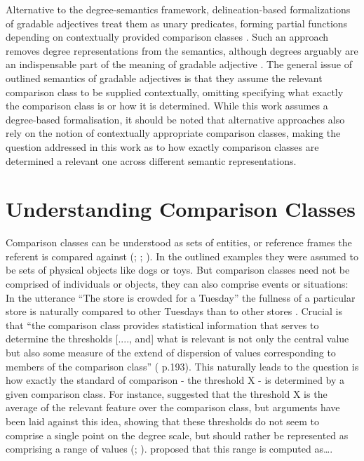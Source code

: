 Alternative to the degree-semantics framework, delineation-based formalizations of gradable adjectives treat them as unary predicates, forming partial functions depending on contextually provided comparison classes \parencite{Klein1980}. Such an approach removes degree representations from the semantics, although degrees arguably are an indispensable part of the meaning of gradable adjective \parencite{Solt2009}. 
The general issue of outlined semantics of gradable adjectives is that they assume the relevant comparison class to be supplied contextually, omitting specifying what exactly the comparison class is or how it is determined. 
While this work assumes a degree-based formalisation, it should be noted that alternative approaches also rely on the notion of contextually appropriate comparison classes, making the question addressed in this work as to how exactly comparison classes are determined a relevant one across different semantic representations.

\section{Understanding Comparison Classes}
Comparison classes can be understood as sets of entities, or reference frames the referent is compared against (\cite{Bierwisch1989}; \cite{Solt2009}; \cite{Klein1980}). In the outlined examples they were assumed to be sets of physical objects like dogs or toys. But comparison classes need not be comprised of individuals or objects, they can also comprise events or situations: In the utterance “The store is crowded for a Tuesday” the fullness of a particular store is naturally compared to other Tuesdays than to other stores \parencite{Solt2009}. Crucial is that “the comparison class provides statistical information that serves to determine the thresholds [...., and] what is relevant is not only the central value but also some measure of the extend of dispersion of values corresponding to members of the comparison class” (\cite{Solt2009} p.193).  
This naturally leads to the question is how exactly the standard of comparison - the threshold X - is determined by a given comparison class. For instance, \cite{Cresswell1976} suggested that the threshold X is the average of the relevant feature over the comparison class, but arguments have been laid against this idea, showing that these thresholds do not seem to comprise a single point on the degree scale, but should rather be represented as comprising a range of values (\cite{Kennedy2007}; \cite{vonStechow1984}). 
\cite{Solt2009} proposed that this range is computed as….

